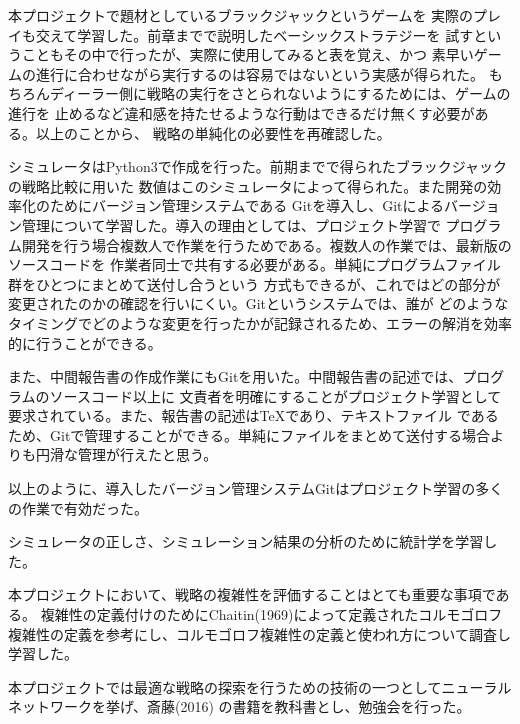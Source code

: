本プロジェクトで題材としているブラックジャックというゲームを
実際のプレイも交えて学習した。前章までで説明したベーシックストラテジーを
試すということもその中で行ったが、実際に使用してみると表を覚え、かつ
素早いゲームの進行に合わせながら実行するのは容易ではないという実感が得られた。
もちろんディーラー側に戦略の実行をさとられないようにするためには、ゲームの進行を
止めるなど違和感を持たせるような行動はできるだけ無くす必要がある。以上のことから、
戦略の単純化の必要性を再確認した。

シミュレータはPython3で作成を行った。前期までで得られたブラックジャックの戦略比較に用いた
数値はこのシミュレータによって得られた。また開発の効率化のためにバージョン管理システムである
Gitを導入し、Gitによるバージョン管理について学習した。導入の理由としては、プロジェクト学習で
プログラム開発を行う場合複数人で作業を行うためである。複数人の作業では、最新版のソースコードを
作業者同士で共有する必要がある。単純にプログラムファイル群をひとつにまとめて送付し合うという
方式もできるが、これではどの部分が変更されたのかの確認を行いにくい。Gitというシステムでは、誰が
どのようなタイミングでどのような変更を行ったかが記録されるため、エラーの解消を効率的に行うことができる。

また、中間報告書の作成作業にもGitを用いた。中間報告書の記述では、プログラムのソースコード以上に
文責者を明確にすることがプロジェクト学習として要求されている。また、報告書の記述はTeXであり、テキストファイル
であるため、Gitで管理することができる。単純にファイルをまとめて送付する場合よりも円滑な管理が行えたと思う。

以上のように、導入したバージョン管理システムGitはプロジェクト学習の多くの作業で有効だった。

シミュレータの正しさ、シミュレーション結果の分析のために統計学を学習した。

本プロジェクトにおいて、戦略の複雑性を評価することはとても重要な事項である。
複雑性の定義付けのためにChaitin(1969)によって定義されたコルモゴロフ複雑性の定義を参考にし、コルモゴロフ複雑性の定義と使われ方について調査し学習した。

本プロジェクトでは最適な戦略の探索を行うための技術の一つとしてニューラルネットワークを挙げ、斎藤(2016) の書籍を教科書とし、勉強会を行った。


